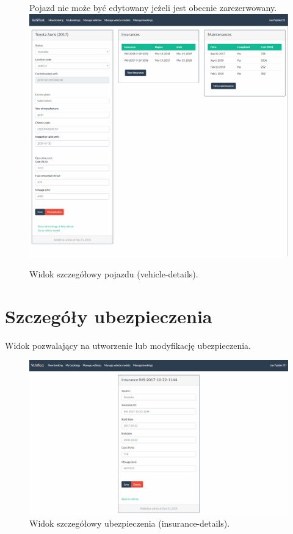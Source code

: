 \documentclass[eng,printmode,openany]{mgr}
\begin{document}
\begin{appendices}
\begin{figure}[H]
			Pojazd nie może być edytowany jeżeli jest obecnie zarezerwowany.
			\centering
			\includegraphics[width=\textwidth]{images/views/vehicle-detail.png}
			\caption{Widok szczegółowy pojazdu (vehicle-details).}		
		\end{figure}
		
		\newpage
		\section{Szczegóły ubezpieczenia}
		Widok pozwalający na utworzenie lub modyfikację ubezpieczenia.
		\begin{figure}[H]
			\centering
			\includegraphics[scale=0.32]{images/views/insurance-detail.png}
			\caption{Widok szczegółowy ubezpieczenia (insurance-details).}		
		\end{figure}
		

\end{appendices}
\end{document}
